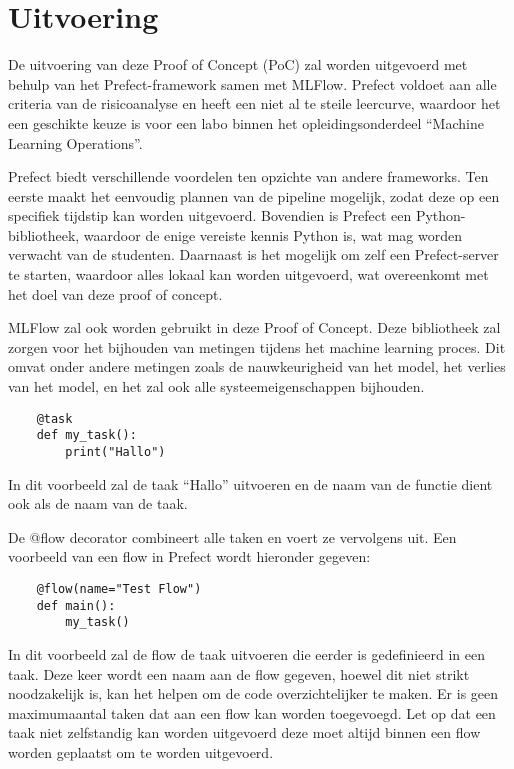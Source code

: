 \section{Uitvoering}
De uitvoering van deze Proof of Concept (PoC) zal worden uitgevoerd met behulp van het Prefect-framework samen met MLFlow. Prefect voldoet aan alle criteria van de risicoanalyse en heeft een niet al te steile leercurve, waardoor het een geschikte keuze is voor een labo binnen het opleidingsonderdeel ``Machine Learning Operations''.

Prefect biedt verschillende voordelen ten opzichte van andere frameworks. Ten eerste maakt het eenvoudig plannen van de pipeline mogelijk, zodat deze op een specifiek tijdstip kan worden uitgevoerd. Bovendien is Prefect een Python-bibliotheek, waardoor de enige vereiste kennis Python is, wat mag worden verwacht van de studenten. Daarnaast is het mogelijk om zelf een Prefect-server te starten, waardoor alles lokaal kan worden uitgevoerd, wat overeenkomt met het doel van deze proof of concept.

MLFlow zal ook worden gebruikt in deze Proof of Concept. Deze bibliotheek zal zorgen voor het bijhouden van metingen tijdens het machine learning proces. Dit omvat onder andere metingen zoals de nauwkeurigheid van het model, het verlies van het model, en het zal ook alle systeemeigenschappen bijhouden.


\begin{verbatim}
    @task
    def my_task():
        print("Hallo")
\end{verbatim}

In dit voorbeeld zal de taak ``Hallo'' uitvoeren en de naam van de functie dient ook als de naam van de taak.

De @flow decorator combineert alle taken en voert ze vervolgens uit. Een voorbeeld van een flow in Prefect wordt hieronder gegeven:
\begin{verbatim}
    @flow(name="Test Flow")
    def main():
        my_task()
\end{verbatim}
In dit voorbeeld zal de flow de taak uitvoeren die eerder is gedefinieerd in een taak. Deze keer wordt een naam aan de flow gegeven, hoewel dit niet strikt noodzakelijk is, kan het helpen om de code overzichtelijker te maken. Er is geen maximumaantal taken dat aan een flow kan worden toegevoegd. Let op dat een taak niet zelfstandig kan worden uitgevoerd deze moet altijd binnen een flow worden geplaatst om te worden uitgevoerd.

